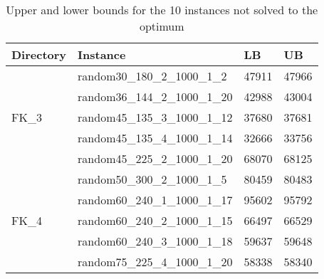 \begin{table}[!htbp]
    \centering
    \begin{tabular}{@{}llll@{}}
        \toprule
        Directory              & Instance                      & LB    & UB    \\ \midrule
        \multirow{5}{*}{FK\_3} & random30\_180\_2\_1000\_1\_2  & 47911 & 47966 \\
        & random36\_144\_2\_1000\_1\_20 & 42988 & 43004 \\
        & random45\_135\_3\_1000\_1\_12 & 37680 & 37681 \\
        & random45\_135\_4\_1000\_1\_14 & 32666 & 33756 \\
        & random45\_225\_2\_1000\_1\_20 & 68070 & 68125 \\ \midrule
        \multirow{5}{*}{FK\_4} & random50\_300\_2\_1000\_1\_5  & 80459 & 80483 \\
        & random60\_240\_1\_1000\_1\_17 & 95602 & 95792 \\
        & random60\_240\_2\_1000\_1\_15 & 66497 & 66529 \\
        & random60\_240\_3\_1000\_1\_18 & 59637 & 59648 \\
        & random75\_225\_4\_1000\_1\_20 & 58338 & 58340 \\ \bottomrule
    \end{tabular}
    \caption{Upper and lower bounds for the 10 instances not solved to the optimum}
    \label{tab:exact_noopt}
\end{table}

